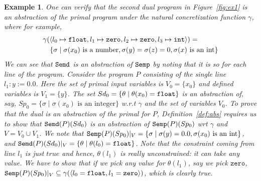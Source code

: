\documentclass[preprint]{sig-alternate-05-2015}
\newtheorem{example}{Example}
\def\semp{{\tt{Semp}}}
\def\semd{{\tt{Semd}}}
\def\zero{{\tt{zero}}}
\def\float{{\tt{float}}}
\def\int{{\tt{int}}}
\def\ds{{\mathit{\theta}}}   %
\def\zero{{\mathtt{zero}}}
\begin{document}
\begin{example}
  One can verify that the second dual program in Figure~\ref{fig:ex1} is
  an abstraction of the primal program 
  under the
  natural concretization function $\gamma$, where for example,
  \begin{eqnarray*}
    \lefteqn{\gamma(\langle l_0 \mapsto \float, 
                 l_1 \mapsto \zero, 
                 l_2\mapsto \zero, 
               l_3\mapsto \int\rangle) = }
                 \\ &&
                 \{\sigma\mid \sigma(x_0) \mbox{ is a number},
                   \sigma(y)=\sigma(z)=0, 
                 \sigma(x) \mbox{ is an int}\}
  \end{eqnarray*}
%
  We can see that $\semd$ is an abstraction of $\semp$ by noting that
  it is so for each line of the program.
  Consider the program $P$ consisting of the single line $l_1: y := 0.0$. 
  Here the set of primal input variables is $V_0=\{x_0\}$ and 
  defined variables is $V_1=\{y\}$.
  The set $Sd_0 = \{\theta\mid \theta(x_0)=\float\}$ is an 
  abstraction of, say, 
  $Sp_0 = \{\sigma\mid\sigma(x_0)\mbox{ is an integer}\}$ w.r.t $\gamma$
  and the set of variables $V_0$.
  To prove that the dual is an abstraction of the primal for $P$,
  Definition~\ref{def:abs} requires us to show that $\semd(P)(Sd_0)$ is an
  abstraction of $\semp(P)(Sp_0)$ wrt $\gamma$ and $V=V_0\cup V_1$.
  We note that
  $\semp(P)(Sp_0)|_V = \{\sigma \mid \sigma(y)=0.0, \sigma(x_0) {\mbox{ is an int}}\}$,
  and
  $\semd(P)(Sd_0)|_V = \{\theta \mid \theta(l_0)=\float\}$.
  Note that the constraint coming from line $l_1$ is just $\mathit{true}$
  and hence, $\theta(l_1)$ is really unconstrained: it can take any value.
  We have to show that if we pick {\em{any}} value for $\theta(l_1)$, say
  we pick $\zero$, 
  $\semp(P)(Sp_0)|_V \subseteq \gamma(\langle l_0=\float,l_1=\zero\rangle)$,
  which is clearly true.

\end{example}
\end{document}
